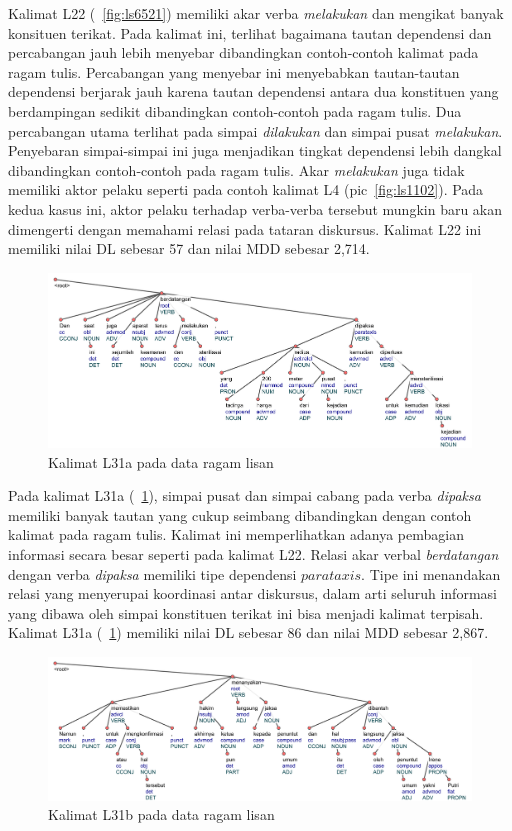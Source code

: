 Kalimat L22 (\pic~\ref{fig:ls6521}) memiliki akar verba \textit{melakukan} dan mengikat banyak konsituen terikat. Pada kalimat ini, terlihat bagaimana tautan dependensi dan percabangan jauh lebih menyebar dibandingkan contoh-contoh kalimat pada ragam tulis. Percabangan yang menyebar ini menyebabkan tautan-tautan dependensi berjarak jauh karena tautan dependensi antara dua konstituen yang berdampingan sedikit dibandingkan contoh-contoh pada ragam tulis. Dua percabangan utama terlihat pada simpai \textit{dilakukan} dan simpai pusat \textit{melakukan}. Penyebaran simpai-simpai ini juga menjadikan tingkat dependensi lebih dangkal dibandingkan contoh-contoh pada ragam tulis. Akar \textit{melakukan} juga tidak memiliki aktor pelaku seperti pada contoh kalimat L4 (pic~\ref{fig:ls1102}). Pada kedua kasus ini, aktor pelaku terhadap verba-verba tersebut mungkin baru akan dimengerti dengan memahami relasi pada tataran diskursus. Kalimat L22 ini memiliki nilai DL sebesar 57 dan nilai MDD sebesar 2,714. 

\begin{figure}
	\centering \includegraphics[width=1
	\textwidth] {pics/ls1716.jpg} 
	\caption{Kalimat L31a pada data ragam lisan} 
	\label{fig:ls1716} 
\end{figure}

Pada kalimat L31a (\pic~\ref{fig:ls1716}), simpai pusat dan simpai cabang pada verba \textit{dipaksa} memiliki banyak tautan yang cukup seimbang dibandingkan dengan contoh kalimat pada ragam tulis. Kalimat ini memperlihatkan adanya pembagian informasi secara besar seperti pada kalimat L22. Relasi akar verbal \textit{berdatangan} dengan verba \textit{dipaksa} memiliki tipe dependensi $parataxis$. Tipe ini menandakan relasi yang menyerupai koordinasi antar diskursus, dalam arti seluruh informasi yang dibawa oleh simpai konstituen terikat ini bisa menjadi kalimat terpisah. Kalimat L31a (\pic~\ref{fig:ls1716}) memiliki nilai DL sebesar 86 dan nilai MDD sebesar 2,867. 

\begin{figure}
	\centering \includegraphics[width=1
	\textwidth] {pics/ls16.jpg} 
	\caption{Kalimat L31b pada data ragam lisan}
	\label{fig:ls16} 
\end{figure}

